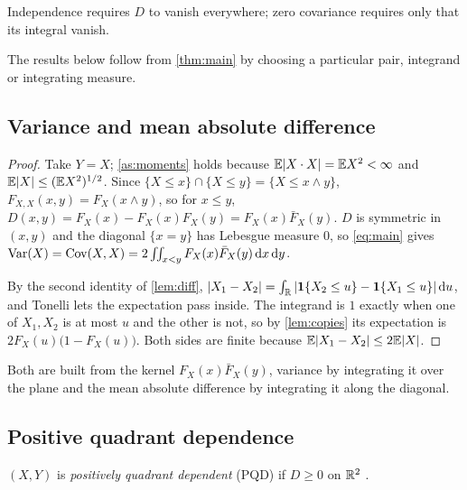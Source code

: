 \documentclass{saim-blog}
\begin{document}
\begin{pullquote}
Independence requires $D$ to vanish everywhere; zero covariance requires only that its integral vanish.
\end{pullquote}

\SecUses
The results below follow from \cref{thm:main} by choosing a particular pair, integrand or integrating measure.

\subsection{Variance and mean absolute difference}
\begin{proof}
Take $Y=X$; \cref{as:moments} holds because $\mathbb{E}|X\cdot X|=\mathbb{E} X^2<\infty$ and $\mathbb{E}|X|\le(\mathbb{E} X^2)^{1/2}$. Since $\{X\le x\}\cap\{X\le y\}=\{X\le x\wedge y\}$, $F_{X,X}(x,y)=F_X(x\wedge y)$, so for $x\le y$, $D(x,y)=F_X(x)-F_X(x)F_X(y)=F_X(x)\bar F_X(y)$. $D$ is symmetric in $(x,y)$ and the diagonal $\{x=y\}$ has Lebesgue measure $0$, so \eqref{eq:main} gives $\operatorname{Var}(X)=\operatorname{Cov}(X,X)=2\iint_{x<y}F_X(x)\bar F_X(y)\mathop{}\!\mathrm{d} x\mathop{}\!\mathrm{d} y$.

By the second identity of \cref{lem:diff}, $|X_1-X_2|=\int_{\mathbb{R}}|\mathbf{1}\{X_2\le u\}-\mathbf{1}\{X_1\le u\}|\mathop{}\!\mathrm{d} u$, and Tonelli lets the expectation pass inside. The integrand is $1$ exactly when one of $X_1,X_2$ is at most $u$ and the other is not, so by \cref{lem:copies} its expectation is $2F_X(u)\big(1-F_X(u)\big)$. Both sides are finite because $\mathbb{E}|X_1-X_2|\le2\mathbb{E}|X|$.
\end{proof}
Both are built from the kernel $F_X(x)\bar F_X(y)$, variance by integrating it over the plane and the mean absolute difference by integrating it along the diagonal.

\subsection{Positive quadrant dependence}
$(X,Y)$ is \emph{positively quadrant dependent} (PQD) if $D\ge0$ on $\mathbb{R}^2$ \citep{lehmann1966}.
\end{document}
